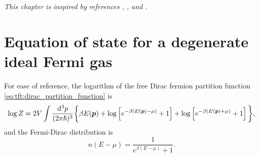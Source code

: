 \textit{This chapter is inspired by references \cite{ref:jensoluf}, \cite{ref:glendenning}, \cite{ref:mtw} and \cite{ref:stability_methods}.}

\section{Equation of state for a degenerate ideal Fermi gas}
\label{sec:nstars:eos}

For ease of reference, the logarithm of the free Dirac fermion partition function \eqref{eq:tft:dirac_partition_function} is
\begin{equation}
	\log Z = 2 V \int \frac{\mathop{}\!\mathrm{d}^3 p}{(2 \pi \hbar)^3} \bigg\{ \beta E({\bm{p}}) + \log \left[ e^{-\beta (E({\bm{p}}) - \mu)}+1 \right] + \log \left[ e^{-\beta (E({\bm{p}}) + \mu)} + 1\right] \bigg\},
\end{equation}
and the Fermi-Dirac distribution is
\begin{equation}
	n(E-\mu) = \frac{1}{e^{\beta (E-\mu)} + 1}.
\label{eq:nstars:fermi_dirac_distribution}
\end{equation}

